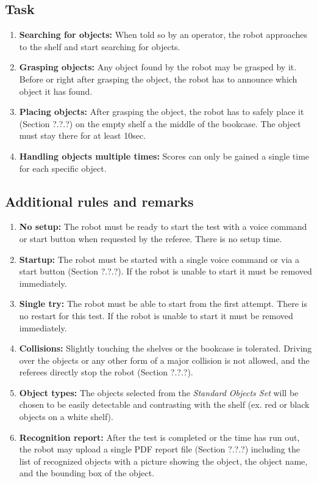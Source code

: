 \subsection{Task}
\begin{enumerate}
\item \textbf{Searching for objects:} When told so by an operator, the robot approaches to the shelf and start searching for objects.
\item \textbf{Grasping objects:} Any object found by the robot may be grasped by it. Before or right after grasping the object, the robot has to announce which object it has found.
\item \textbf{Placing objects:} After grasping the object, the robot has to safely place it (Section ?.?.?) on the empty shelf a the middle of the bookcase. The object must stay there for at least 10sec.
\item \textbf{Handling objects multiple times:} Scores can only be gained a single time for each specific object.
\end{enumerate}

\subsection{Additional rules and remarks}
\begin{enumerate}
\item \textbf{No setup:} The robot must be ready to start the test with a voice command or start button when requested by the referee. There is no setup time.
\item \textbf{Startup:} The robot must be started with a single voice command or via a start button (Section ?.?.?). If the robot is unable to start it must be removed immediately.
\item \textbf{Single try:} The robot must be able to start from the first attempt. There is no restart for this test. If the robot is unable to start it must be removed immediately.
\item \textbf{Collisions:} Slightly touching the shelves or the bookcase is tolerated. Driving over the objects or any other form of a major collision is not allowed, and the referees directly stop the robot (Section ?.?.?).
\item \textbf{Object types:} The objects selected from the \textit{Standard Objects Set} will be chosen to be easily detectable and contrasting with the shelf (ex. red or black objects on a white shelf).
\item \textbf{Recognition report:} After the test is completed or the time has run out, the robot may upload a single PDF report file (Section ?.?.?) including the list of recognized objects with a picture showing the object, the object name, and the bounding box of the object.
\end{enumerate}

